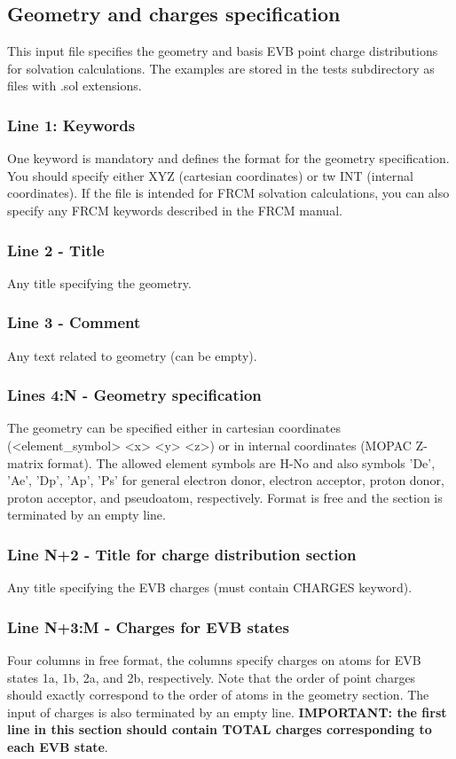 \documentclass[oneside,11pt,openany]{book}
\newcommand{\tw}{\ttfamily}
\begin{document}
\subsection{Geometry and charges specification}
This input file specifies the geometry and basis EVB point charge
distributions for solvation calculations. The examples are stored
in the {\tw tests} subdirectory as files with
{\tw .sol} extensions.
%
\subsubsection*{Line 1: Keywords}
One keyword is mandatory and defines the format for the geometry
specification. You should specify either {\tw XYZ}
(cartesian coordinates) or {tw INT} (internal coordinates).
If the file is intended for FRCM solvation calculations,
you can also specify any FRCM keywords described in the FRCM
manual.

\subsubsection*{Line 2 - Title}
Any title specifying the geometry.

\subsubsection*{Line 3 - Comment}
Any text related to geometry (can be empty).

\subsubsection*{Lines 4:N - Geometry specification}
The geometry can be specified either in cartesian coordinates
({\tw <element\_symbol>  <x>   <y>   <z>}) or in internal
coordinates ({\tw MOPAC} Z-matrix format). The allowed
element symbols are H-No and also symbols
'De', 'Ae', 'Dp', 'Ap', 'Ps' for general electron donor,
electron acceptor, proton donor, proton acceptor,
and pseudoatom, respectively. Format is free
and the section is terminated by an empty line.

\subsubsection*{Line N+2 - Title for charge distribution section}
Any title specifying the EVB charges (must contain {\tw CHARGES} keyword).

\subsubsection*{Line N+3:M - Charges for EVB states}
Four columns in free format, the columns specify charges
on atoms for EVB states 1a, 1b, 2a, and 2b, respectively.
Note that the order of point charges should exactly
correspond to the order of atoms in the geometry section.
The input of charges is also terminated by an empty line.
{\bf IMPORTANT: the first line in this section should contain TOTAL
charges corresponding to each EVB state}.
\end{document}
